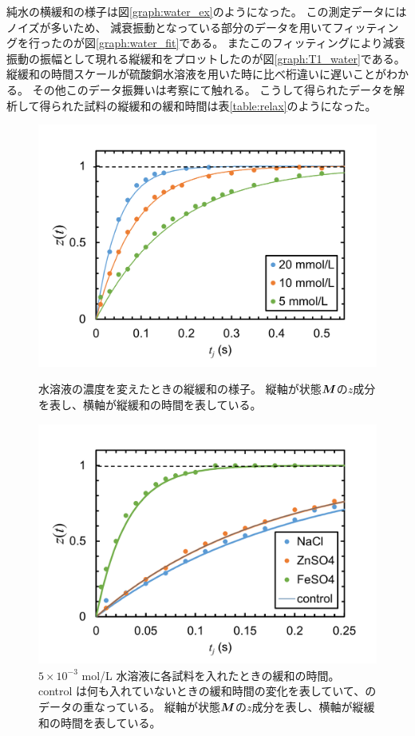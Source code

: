 \documentclass[11pt,dvipdfmx,a4paper]{jsarticle}
\begin{document}
純水の横緩和の様子は図\ref{graph:water_ex}のようになった。
この測定データにはノイズが多いため、
減衰振動となっている部分のデータを用いてフィッティングを行ったのが図\ref{graph:water_fit}である。
またこのフィッティングにより減衰振動の振幅として現れる縦緩和をプロットしたのが図\ref{graph:T1_water}である。
縦緩和の時間スケールが硫酸銅水溶液を用いた時に比べ桁違いに遅いことがわかる。
その他このデータ振舞いは考察にて触れる。
こうして得られたデータを解析して得られた試料の縦緩和の緩和時間は表\ref{table:relax}のようになった。
\begin{figure}[h]
	\centering
	\begin{minipage}[t]{0.48\columnwidth}
		\centering
		\includegraphics[width=\columnwidth]{graph/T1_con.png}
		\caption{水溶液の濃度を変えたときの縦緩和の様子。
		縦軸が状態\(\vb*{M}\)の\(z\)成分を表し、横軸が縦緩和の時間を表している。}
		\label{graph:T1_con}
	\end{minipage}
	\hfill
	\begin{minipage}[t]{0.48\columnwidth}
		\centering
		\includegraphics[width=\columnwidth]{graph/T1_var.png}
		\caption{\(5\times 10^{-3}\) mol/L  水溶液に各試料を入れたときの緩和の時間。
		control は何も入れていないときの緩和時間の変化を表していて、のデータの重なっている。
		縦軸が状態\(\vb*{M}\)の\(z\)成分を表し、横軸が縦緩和の時間を表している。}
		\label{graph:T1_var}
	\end{minipage}
\end{figure}
\end{document}
